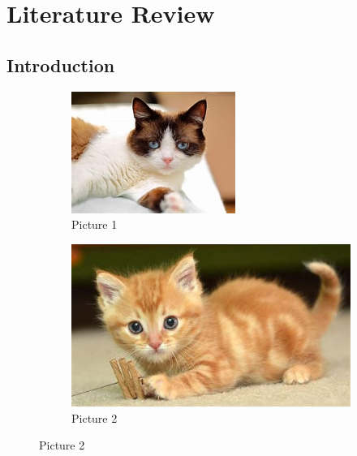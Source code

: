 \chapter{Literature Review}\label{ch:literature}

\section{Introduction}\label{sec:intro}


\begin{figure}[H]
	\begin{subfigure}[b]{0.4\textwidth}
		\includegraphics[width=\textwidth]{files/imgs/cat.jpg}
		\caption{Picture 1}
		\label{cat1}
	\end{subfigure}

	\begin{subfigure}[b]{0.4\textwidth}
		\includegraphics[width=\textwidth]{files/imgs/cat2.jpg}
		\caption{Picture 2}
		\label{cat2}
	\end{subfigure}
\end{figure}


